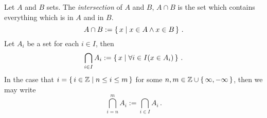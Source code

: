 \guard




\begin{defn}
\label{defn:intersection}
  Let $A$ and $B$ sets.
  The \emph{intersection} of $A$ and $B$, $A\cap B$ is the set which contains everything which is in $A$ and in $B$.
  \[ A\cap B := \left\{\, x \mid x\in A \wedge x\in B\,\right\}\,.\]
  Let $A_i$ be a set for each $i\in I$, then \[ \bigcap_{i\in I} A_i:=\left\{\, x\mid \forall i\in I(x\in A_i)\,\right\}\,.\]
  In the case that $i=\left\{\,i\in\mathbb{Z}\mid n\leq i \leq m \,\right\}$ for some $n,m\in\mathbb{Z}\cup\left\{\,\infty,-\infty\,\right\}$, then we may write \[ \bigcap_{i=n}^m A_i := \bigcap_{i\in I} A_i\,.\]
\end{defn}
